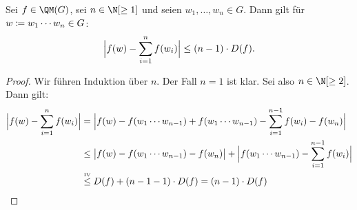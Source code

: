 \begin{thLemma} \label{homo:qmprod}
    Sei $f\in\QM(G)$, sei $n\in\N[\geq1]$ und seien
    $w_1,\dots,w_n\in G$. Dann gilt für $w\defeq w_1\cdots w_n\in G$:
    \[ \abs[\Big]{ f(w) - \isum^n f(w_i) } \leq (n-1)\cdot D(f)  . \]
\end{thLemma}

\begin{proof}
   Wir führen Induktion über $n$. Der Fall $n=1$ ist klar. Sei also
   $n\in\N[\geq2]$. Dann gilt:
   \begin{align*}
       \abs[\Big]{ f(w) - \isum^n f(w_i) }
       &= \abs[\Big]{
           f(w) - f(w_1\cdots w_{n-1}) + f(w_1\cdots w_{n-1})
           - \isum^{n-1} f(w_i) - f(w_n)
          }
       \\
       &\leq
       \abs[\big]{f(w) - f(w_1\cdots w_{n-1}) - f(w_n)}
       + \abs[\Big]{f(w_1\cdots w_{n-1}) - \isum^{n-1} f(w_i)}
       \\
       &\overset{\text{\clap{\tiny IV}}}\leq
           D(f) + (n-1-1) \cdot D(f)
        = (n-1) \cdot D(f)
   \end{align*}
\end{proof}

